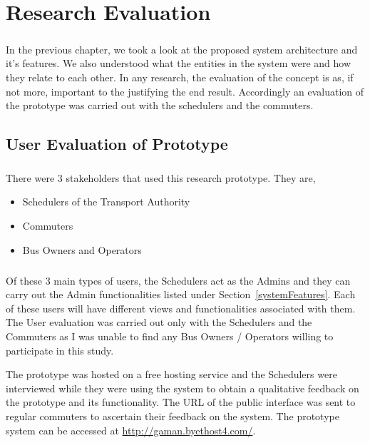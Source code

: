 
\chapter {Research Evaluation}
\label{chapter-ResearchEvaluation}

\paragraph {} In the previous chapter, we took a look at the proposed system architecture and it's features. We also understood what the entities in the system were and how they relate to each other. In any research, the evaluation of the concept is as, if not more, important to the justifying the end result. Accordingly an evaluation of the prototype was carried out with the schedulers and the commuters.



\section{User Evaluation of Prototype}

\paragraph{} There were 3 stakeholders that used this research prototype. They are,

\begin{itemize}
\item Schedulers of the Transport Authority
\item Commuters
\item Bus Owners and Operators
\end{itemize}

\paragraph{} Of these 3 main types of users, the Schedulers act as the Admins and they can carry out the Admin functionalities listed under Section~\ref{systemFeatures}. Each of these users will have different views and functionalities associated with them. The User evaluation was carried out only with the Schedulers and the Commuters as I was unable to find any Bus Owners / Operators willing to participate in this study.

The prototype was hosted on a free hosting service and the Schedulers were interviewed while they were using the system to obtain a qualitative feedback on the prototype and its functionality. The URL of the public interface was sent to regular commuters to ascertain their feedback on the system. The prototype system can be accessed at \url{http://gaman.byethost4.com/}.


